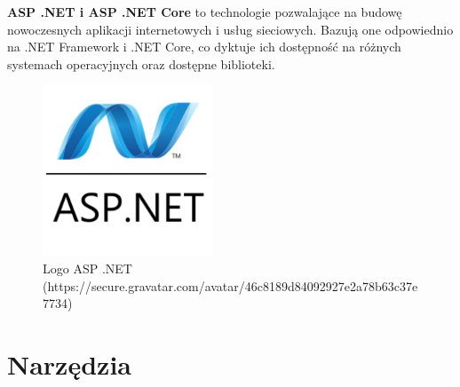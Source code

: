 \textbf{ASP .NET i ASP .NET Core} to technologie pozwalające na budowę nowoczesnych aplikacji internetowych i usług sieciowych. Bazują one odpowiednio na .NET Framework i .NET Core, co dyktuje ich dostępność na różnych systemach operacyjnych oraz dostępne biblioteki.
\begin{figure}[!ht]
	\begin{center}
		\includegraphics[width=2in]{img/logo/aspdotnet.png}
		\caption{Logo ASP .NET (https://secure.gravatar.com/avatar/46c8189d84092927e2a78b63c37e7734)}
		\label{aspdotnet_logo}
	\end{center}
\end{figure}
\section{Narzędzia}

